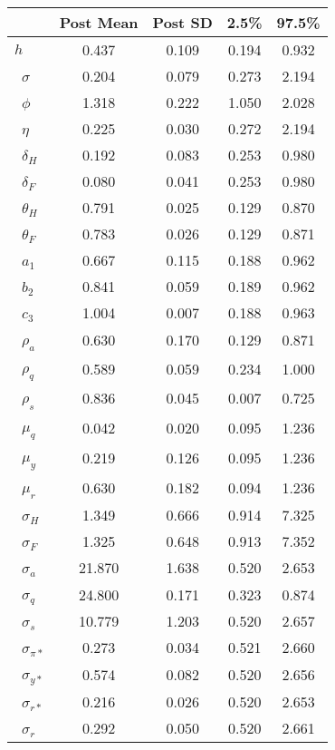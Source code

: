 \begin{tiny}\begin{tabular}{lcccc}
\hline
&\textbf{Post Mean}&\textbf{Post SD}&\textbf{2.5\%}&\textbf{97.5\%}\\\hline
\textbf{$ h             $}&0.437&0.109&0.194&0.932\\\
\textbf{$ \sigma        $}&0.204&0.079&0.273&2.194\\\
\textbf{$ \phi          $}&1.318&0.222&1.050&2.028\\\
\textbf{$ \eta          $}&0.225&0.030&0.272&2.194\\\
\textbf{$ \delta_{H}    $}&0.192&0.083&0.253&0.980\\\
\textbf{$ \delta_{F}    $}&0.080&0.041&0.253&0.980\\\
\textbf{$ \theta_{H}    $}&0.791&0.025&0.129&0.870\\\
\textbf{$ \theta_{F}    $}&0.783&0.026&0.129&0.871\\\
\textbf{$ a_{1}         $}&0.667&0.115&0.188&0.962\\\
\textbf{$ b_{2}         $}&0.841&0.059&0.189&0.962\\\
\textbf{$ c_{3}         $}&1.004&0.007&0.188&0.963\\\
\textbf{$ \rho_{a}      $}&0.630&0.170&0.129&0.871\\\
\textbf{$ \rho_{q}      $}&0.589&0.059&0.234&1.000\\\
\textbf{$ \rho_{s}      $}&0.836&0.045&0.007&0.725\\\
\textbf{$ \mu_{q}       $}&0.042&0.020&0.095&1.236\\\
\textbf{$ \mu_{y}       $}&0.219&0.126&0.095&1.236\\\
\textbf{$ \mu_{r}       $}&0.630&0.182&0.094&1.236\\\
\textbf{$ \sigma_{H}    $}&1.349&0.666&0.914&7.325\\\
\textbf{$ \sigma_{F}    $}&1.325&0.648&0.913&7.352\\\
\textbf{$ \sigma_{a}    $}&21.870&1.638&0.520&2.653\\\
\textbf{$ \sigma_{q}    $}&24.800&0.171&0.323&0.874\\\
\textbf{$ \sigma_{s}    $}&10.779&1.203&0.520&2.657\\\
\textbf{$ \sigma_{\pi*} $}&0.273&0.034&0.521&2.660\\\
\textbf{$ \sigma_{y*}   $}&0.574&0.082&0.520&2.656\\\
\textbf{$ \sigma_{r*}   $}&0.216&0.026&0.520&2.653\\\
\textbf{$ \sigma_{r}    $}&0.292&0.050&0.520&2.661\\\hline
\end{tabular}
\end{tiny}